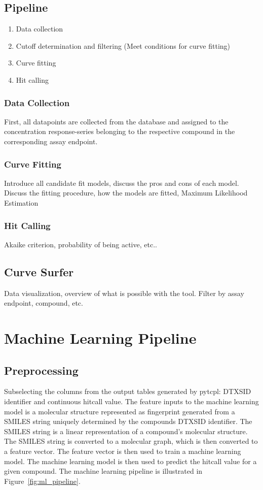 \subsection{Pipeline}
\begin{enumerate}
    \item Data collection
    \item Cutoff determination and filtering (Meet conditions for curve fitting)
    \item Curve fitting
    \item Hit calling
\end{enumerate}
\subsubsection{Data Collection}
First, all datapoints are collected from the database and assigned to the concentration response-series belonging to the respective compound in the corresponding assay endpoint.
\subsubsection{Curve Fitting}
Introduce all candidate fit models, discuss the pros and cons of each model. Discuss the fitting procedure, how the models are fitted, Maximum Likelihood Estimation
\subsubsection{Hit Calling}
Akaike criterion, probability of being active, etc..
\subsection{Curve Surfer}
Data visualization, overview of what is possible with the tool. Filter by assay endpoint, compound, etc.


\section{Machine Learning Pipeline}
\subsection{Preprocessing}
Subselecting the columns from the output tables generated by pytcpl: DTXSID identifier and continuous hitcall value. The feature inputs to the machine learning model is a molecular structure represented as fingerprint generated from a SMILES string uniquely determined by the compounds DTXSID identifier. The SMILES string is a linear representation of a compound's molecular structure. The SMILES string is converted to a molecular graph, which is then converted to a feature vector. The feature vector is then used to train a machine learning model. The machine learning model is then used to predict the hitcall value for a given compound. The machine learning pipeline is illustrated in Figure~\ref{fig:ml_pipeline}. 


